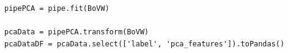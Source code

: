 \documentclass[8pt,aspectratio=169,hyperref={unicode=true}]{beamer}
\begin{document}
\begin{frame}[fragile]{\insertsubsection}
\begin{columns}
\begin{column}{.75\textwidth}
\begin{verbatim}
pipePCA = pipe.fit(BoVW)

pcaData = pipePCA.transform(BoVW)
pcaDataDF = pcaData.select(['label', 'pca_features']).toPandas()
      \end{verbatim}
    \end{column}
  \end{columns}
\end{frame}
\end{document}
